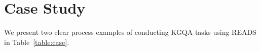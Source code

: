 \documentclass[11pt]{article}
\begin{document}
\section{Case Study}
\label{sec:case}

We present two clear process examples of conducting KGQA tasks using READS in Table~\ref{table:case}.



\end{document}
